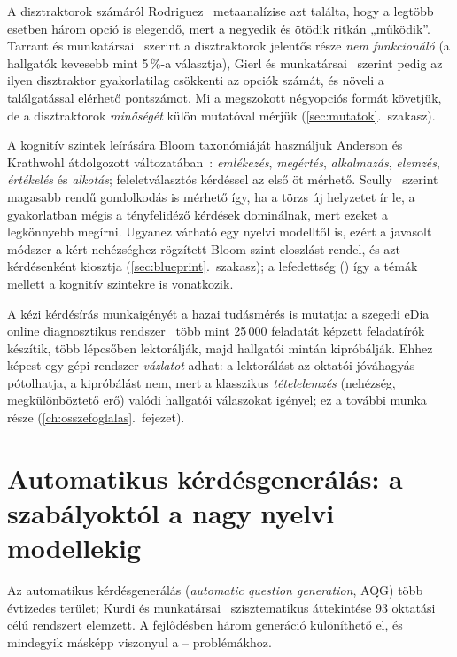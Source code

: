 A disztraktorok számáról Rodriguez~\cite{rodriguez2005three} metaanalízise azt találta, hogy a legtöbb
esetben három opció is elegendő, mert a negyedik és ötödik ritkán „működik”. Tarrant és
munkatársai~\cite{tarrant2009distractors} szerint a disztraktorok jelentős része \emph{nem funkcionáló}
(a hallgatók kevesebb mint 5\,\%-a választja), Gierl és munkatársai~\cite{gierl2017distractors} szerint
pedig az ilyen disztraktor gyakorlatilag csökkenti az opciók számát, és növeli a találgatással elérhető
pontszámot. Mi a megszokott négyopciós formát követjük, de a disztraktorok \emph{minőségét} külön
mutatóval mérjük (\ref{sec:mutatok}.~szakasz).

A kognitív szintek leírására Bloom taxonómiáját használjuk Anderson és Krathwohl átdolgozott
változatában~\cite{anderson2001bloom}: \emph{emlékezés}, \emph{megértés}, \emph{alkalmazás},
\emph{elemzés}, \emph{értékelés} és \emph{alkotás}; feleletválasztós kérdéssel az első öt mérhető.
Scully~\cite{scully2017constructing} szerint magasabb rendű gondolkodás is mérhető így, ha a törzs új
helyzetet ír le, a gyakorlatban mégis a tényfelidéző kérdések dominálnak, mert ezeket a legkönnyebb
megírni. Ugyanez várható egy nyelvi modelltől is, ezért a javasolt módszer a kért nehézséghez rögzített
Bloom-szint-eloszlást rendel, és azt kérdésenként kiosztja (\ref{sec:blueprint}.~szakasz); a lefedettség
() így a témák mellett a kognitív szintekre is vonatkozik.

A kézi kérdésírás munkaigényét a hazai tudásmérés is mutatja: a szegedi eDia online diagnosztikus
rendszer~\cite{csapo2019edia} több mint 25\,000 feladatát képzett feladatírók készítik, több lépcsőben
lektorálják, majd hallgatói mintán kipróbálják. Ehhez képest egy gépi rendszer \emph{vázlatot} adhat: a
lektorálást az oktatói jóváhagyás pótolhatja, a kipróbálást nem, mert a klasszikus \emph{tételelemzés}
(nehézség, megkülönböztető erő) valódi hallgatói válaszokat igényel; ez a további munka része
(\ref{ch:osszefoglalas}.~fejezet).

\section{Automatikus kérdésgenerálás: a szabályoktól a nagy nyelvi modellekig}
\label{sec:irod-aqg}
\label{sec:irod-llm-aqg}

Az automatikus kérdésgenerálás (\emph{automatic question generation}, AQG) több évtizedes terület;
Kurdi és munkatársai~\cite{kurdi2020systematic} szisztematikus áttekintése 93 oktatási célú rendszert
elemzett. A fejlődésben három generáció különíthető el, és mindegyik másképp viszonyul a --
problémákhoz.

